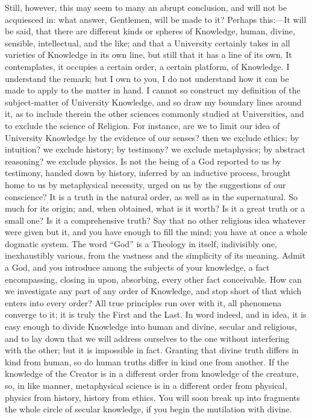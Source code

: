 Still, however, this may seem to many an abrupt conclusion, and
will not be acquiesced in: what answer, Gentlemen, will be made to it?
Perhaps this:—It will be said, that there are different kinds or
spheres of Knowledge, human, divine, sensible, intellectual, and the
like; and that a University certainly takes in all varieties of
Knowledge in its own line, but still that it has a line of its own. It
contemplates, it occupies a certain order, a certain platform, of
Knowledge. I understand the remark; but I own to you, I do not
understand how it can be made to apply to the matter in hand. I cannot
so construct my definition of the subject-matter of University
Knowledge, and so draw my boundary lines around it, as to include
therein the other sciences commonly studied at Universities, and to
exclude the science of Religion. For instance, are we to limit our
idea of University Knowledge by the evidence of our senses? then we
exclude ethics; by intuition? we exclude history; by testimony? we
exclude metaphysics; by abstract reasoning? we exclude physics. Is not
the being of a God reported to us by testimony, handed down by
history, inferred by an inductive process, brought home to us by
metaphysical necessity, urged on us by the suggestions of our
conscience? It is a truth in the natural order, as well as in the
supernatural. So much for its origin; and, when obtained, what is it
worth? Is it a great truth or a small one? Is it a comprehensive truth? Say that no other religious idea whatever were given but it,
and you have enough to fill the mind; you have at once a whole
dogmatic system. The word ``God'' is a Theology in itself,
indivisibly one, inexhaustibly various, from the vastness and the
simplicity of its meaning. Admit a God, and you introduce among the
subjects of your knowledge, a fact encompassing, closing in upon,
absorbing, every other fact conceivable. How can we investigate any
part of any order of Knowledge, and stop short of that which enters
into every order? All true principles run over with it, all phenomena
converge to it; it is truly the First and the Last. In word indeed,
and in idea, it is easy enough to divide Knowledge into human and
divine, secular and religious, and to lay down that we will address
ourselves to the one without interfering with the other; but it is
impossible in fact. Granting that divine truth differs in kind from
human, so do human truths differ in kind one from another. If the
knowledge of the Creator is in a different order from knowledge of the
creature, so, in like manner, metaphysical science is in a different
order from physical, physics from history, history from ethics. You
will soon break up into fragments the whole circle of secular
knowledge, if you begin the mutilation with divine.

